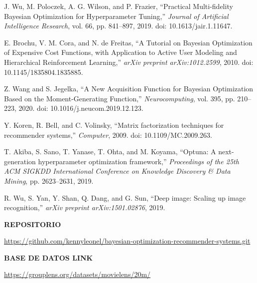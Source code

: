 \documentclass[conference]{IEEEtran}
\begin{document}
\begin{thebibliography}{00}
J. Wu, M. Poloczek, A. G. Wilson, and P. Frazier, ``Practical Multi-fidelity Bayesian Optimization for Hyperparameter Tuning,'' \textit{Journal of Artificial Intelligence Research}, vol. 66, pp. 841--897, 2019. doi: 10.1613/jair.1.11647.

E. Brochu, V. M. Cora, and N. de Freitas, ``A Tutorial on Bayesian Optimization of Expensive Cost Functions, with Application to Active User Modeling and Hierarchical Reinforcement Learning,'' \textit{arXiv preprint arXiv:1012.2599}, 2010. doi: 10.1145/1835804.1835885.

Z. Wang and S. Jegelka, ``A New Acquisition Function for Bayesian Optimization Based on the Moment-Generating Function,'' \textit{Neurocomputing}, vol. 395, pp. 210--223, 2020. doi: 10.1016/j.neucom.2019.12.123.

Y. Koren, R. Bell, and C. Volinsky, ``Matrix factorization techniques for recommender systems,'' \textit{Computer}, 2009. doi: 10.1109/MC.2009.263.

T. Akiba, S. Sano, T. Yanase, T. Ohta, and M. Koyama, ``Optuna: A next-generation hyperparameter optimization framework,'' \textit{Proceedings of the 25th ACM SIGKDD International Conference on Knowledge Discovery \& Data Mining}, pp. 2623--2631, 2019.

R. Wu, S. Yan, Y. Shan, Q. Dang, and G. Sun, ``Deep image: Scaling up image recognition,'' \textit{arXiv preprint arXiv:1501.02876}, 2019.

\end{thebibliography}


\vspace{12pt}

\noindent\textbf{REPOSITORIO}

\vspace{6pt}

\noindent\small\url{https://github.com/kennyleonel/bayesian-optimization-recommender-systems.git}

\vspace{12pt}

\noindent\textbf{BASE DE DATOS LINK}

\vspace{6pt}

\noindent\small\url{https://grouplens.org/datasets/movielens/20m/}
\end{document}
